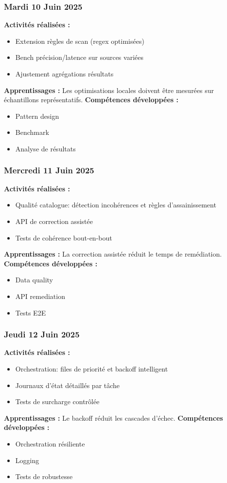 \documentclass[12pt,a4paper]{article}
\begin{document}
\subsubsection{Mardi 10 Juin 2025}
\textbf{Activités réalisées :}
\begin{itemize}
    \item Extension règles de scan (regex optimisées)
    \item Bench précision/latence sur sources variées
    \item Ajustement agrégations résultats
\end{itemize}
\textbf{Apprentissages :} Les optimisations locales doivent être mesurées sur échantillons représentatifs.
\textbf{Compétences développées :}
\begin{itemize}
    \item Pattern design
    \item Benchmark
    \item Analyse de résultats
\end{itemize}

\subsubsection{Mercredi 11 Juin 2025}
\textbf{Activités réalisées :}
\begin{itemize}
    \item Qualité catalogue: détection incohérences et règles d'assainissement
    \item API de correction assistée
    \item Tests de cohérence bout-en-bout
\end{itemize}
\textbf{Apprentissages :} La correction assistée réduit le temps de remédiation.
\textbf{Compétences développées :}
\begin{itemize}
    \item Data quality
    \item API remediation
    \item Tests E2E
\end{itemize}

\subsubsection{Jeudi 12 Juin 2025}
\textbf{Activités réalisées :}
\begin{itemize}
    \item Orchestration: files de priorité et backoff intelligent
    \item Journaux d'état détaillés par tâche
    \item Tests de surcharge contrôlée
\end{itemize}
\textbf{Apprentissages :} Le backoff réduit les cascades d'échec.
\textbf{Compétences développées :}
\begin{itemize}
    \item Orchestration résiliente
    \item Logging
    \item Tests de robustesse
\end{itemize}
\end{document}
